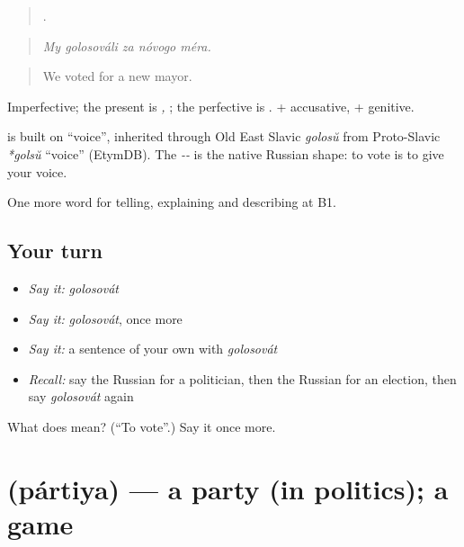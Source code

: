 \begin{quote}
    .
\end{quote}

\begin{quote}
\emph{My golosováli za nóvogo méra.}
\end{quote}

\begin{quote}
We voted for a new mayor.
\end{quote}

Imperfective; the present is \emph{, }; the perfective is \emph{}. \emph{ } + accusative, \emph{} + genitive.

\begin{cousinweb}
\textbf{} is built on \emph{} \textquotedblleft{}voice\textquotedblright{}, inherited through Old East Slavic \emph{golosŭ} from Proto-Slavic \emph{*golsŭ} \textquotedblleft{}voice\textquotedblright{} (EtymDB). The \emph{--} is the native Russian shape: to vote is to give your voice.
\end{cousinweb}

\begin{grammarlens}[title={What you've built}]
One more word for telling, explaining and describing at B1.
\end{grammarlens}

\subsection*{Your turn}
\begin{itemize}
\raggedright
  \item \emph{Say it:} \emph{golosovát}
  \item \emph{Say it:} \emph{golosovát}, once more
  \item \emph{Say it:} a sentence of your own with \emph{golosovát}
  \item \emph{Recall:} say the Russian for a politician, then the Russian for an election, then say \emph{golosovát} again
\end{itemize}

\begin{tcolorbox}[breakable,colback=teal!4,colframe=teal!35!black,title={Before you move on}]
What does  mean? (\textquotedblleft{}To vote\textquotedblright{}.) Say it once more.
\end{tcolorbox}
\section[\texorpdfstring{\ru{партия} (pártiya)}{партия (pártiya)}]{ (pártiya) — a party (in politics); a game}

